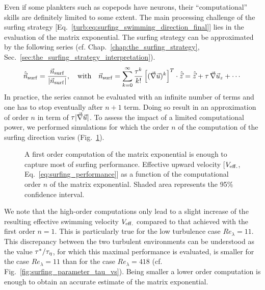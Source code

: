 Even if some plankters such as copepods have neurons, their ``computational'' skills are definitely limited to some extent.
The main processing challenge of the surfing strategy [Eq.~\eqref{turb:eq:surfing_swimming_direction_final}] lies in the evaluation of the matrix exponential.
The surfing strategy can be approximated by the following series (cf. Chap.~\ref{chap:the_surfing_strategy}, Sec.~\ref{sec:the_surfing_strategy_interpretation}).
\begin{equation}\label{eq:exp_series}
	\hat{\vec{n}}_{\mathrm{surf}} = \frac{\vec{n}_{\mathrm{surf}}}{\lvert\vec{n}_{\mathrm{surf}}\rvert}, \quad \text{with} \quad 
	\vec{n}_{\mathrm{surf}} = \sum_{k = 0}^{\infty} \frac{\tau^k}{k!} \left[  ( \vec{\nabla} \vec{u} )^k \right]^T \cdot \hat{\vec{z}} = \hat{\vec{z}} + \tau \, \vec{\nabla} \vec{u}_z + \dotsb
\end{equation}
In practice, the series cannot be evaluated with an infinite number of terms and one has to stop eventually after $n+1$ term.
Doing so result in an approximation of order $n$ in term of $\tau \lvert\vec{\nabla} \vec{u}\rvert$.
To assess the impact of a limited computational power, we performed simulations for which the order $n$ of the computation of the surfing direction varies (Fig.~\ref{fig:surfing_exp_order}).
\begin{figure}%
	\centering
	
	\caption[A first order computation of the matrix exponential is enough to capture most of surfing performance.]{
	A first order computation of the matrix exponential is enough to capture most of surfing performance.
	Effective upward velocity [$V_{\mathrm{eff.}}$, Eq.~\eqref{eq:surfing_performance}] as a function of the computational order $n$ of the matrix exponential.
	Shaded area represents the 95\% confidence interval.
	}
	\label{fig:surfing_exp_order}
\end{figure}

We note that the high-order computations only lead to a slight increase of the resulting effective swimming velocity $V_{\mathrm{eff.}}$ compared to that achieved with the first order $n=1$.
This is particularly true for the low turbulence case $\mathit{Re}_{\lambda} = 11$.
This discrepancy between the two turbulent environments can be understood as the value $\tau^* / \tau_{\eta}$, for which this maximal performance is evaluated, is smaller for the case $\mathit{Re}_{\lambda} = 11$ than for the case $\mathit{Re}_{\lambda} = 418$ (cf. Fig.~\ref{fig:surfing_parameter_tau_vs}).
Being smaller a lower order computation is enough to obtain an accurate estimate of the matrix exponential.

